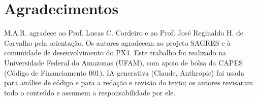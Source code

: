 \documentclass[conference]{IEEEtran}
\begin{document}
\section*{Agradecimentos}
M.A.R. agradece ao Prof. Lucas C. Cordeiro e ao Prof. Jos\'e
Reginaldo H. de Carvalho pela orientação. Os autores agradecem ao
projeto SAGRES e à comunidade de desenvolvimento do PX4. Este
trabalho foi realizado na Universidade Federal do Amazonas (UFAM),
com apoio de bolsa da CAPES (Código de Financiamento 001). IA
generativa (Claude, Anthropic) foi usada para análise de código e
para a redação e revisão do texto; os autores revisaram todo o
conteúdo e assumem a responsabilidade por ele.


{\scriptsize}
\end{document}
